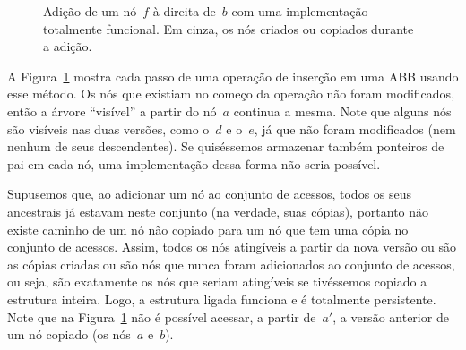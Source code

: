 \documentclass[main.tex]{subfiles}
\begin{document}
\begin{figure}[h]
	\centering
	\caption{Adição de um nó~$f$ à direita de~$b$ com uma implementação totalmente funcional. Em cinza, os nós criados ou copiados durante a adição.} \label{fig:totfunc_ex}
\end{figure}

A Figura~\ref{fig:totfunc_ex} mostra cada passo de uma operação de inserção em uma ABB usando esse método. Os nós que existiam no começo da operação não foram modificados, então a árvore ``visível'' a partir do nó~$a$ continua a mesma. Note que alguns nós são visíveis nas duas versões, como o~$d$ e o~$e$, já que não foram modificados (nem nenhum de seus descendentes). Se quiséssemos armazenar também ponteiros de pai em cada nó, uma implementação dessa forma não seria possível.

Supusemos que, ao adicionar um nó ao conjunto de acessos, todos os seus ancestrais já estavam neste conjunto (na verdade, suas cópias), portanto não existe caminho de um nó não copiado para um nó que tem uma cópia no conjunto de acessos. Assim, todos os nós atingíveis a partir da nova versão ou são as cópias criadas ou são nós que nunca foram adicionados ao conjunto de acessos, ou seja, são exatamente os nós que seriam atingíveis se tivéssemos copiado a estrutura inteira. Logo, a estrutura ligada funciona e é totalmente persistente. Note que na Figura~\ref{fig:totfunc_ex} não é possível acessar, a partir de~$a'$, a versão anterior de um nó copiado (os nós~$a$ e~$b$).
\end{document}
